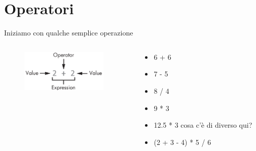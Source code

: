 \section{Operatori}

\begin{frame}{Iniziamo con qualche semplice operazione}
	\begin{columns}
		\begin{column}{4cm}
			\begin{figure}
   				\includegraphics[height=2cm]{images/operatore_espressione.png}
			\end{figure}
		\end{column}
		\begin{column}{6cm}
            \begin{itemize}
                \item  6 + 6
                \item  7 - 5
                \item  8 / 4
                \item  9 * 3
                \item 12.5 * 3 cosa c'è di diverso qui?
                \item  (2 + 3 - 4) * 5 / 6 
            \end{itemize}
		\end{column}
	\end{columns}
\end{frame}

